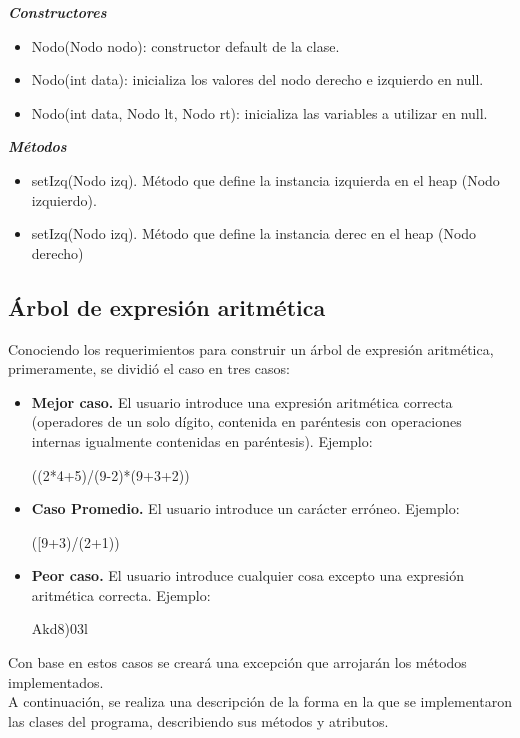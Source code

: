\documentclass{article}
\begin{document}
\textit{\textbf{Constructores}}
\begin{itemize}
    \item Nodo(Nodo nodo): constructor default de la clase.
    \item Nodo(int data): inicializa los valores del nodo derecho e izquierdo en null.
    \item Nodo(int data, Nodo lt, Nodo rt): inicializa las variables a utilizar en null.
\end{itemize}

\textit{\textbf{Métodos}}
\begin{itemize}
    \item setIzq(Nodo izq). Método que define la instancia izquierda en el heap (Nodo izquierdo).
    \item setIzq(Nodo izq). Método que define la instancia derec en el heap (Nodo derecho)
    
\end{itemize}
\newpage
\subsection{Árbol de expresión aritmética}
\vspace{5mm} %
Conociendo los requerimientos para construir un árbol de expresión aritmética, primeramente, se dividió el caso en tres casos:
\begin{itemize}
\item \textbf{Mejor caso.} El usuario introduce una expresión aritmética correcta (operadores de un solo dígito, contenida en paréntesis con operaciones internas igualmente contenidas en paréntesis). Ejemplo:
\begin{center}
 ((2*4+5)/(9-2)*(9+3+2))   
\end{center}
\item \textbf{Caso Promedio.} El usuario introduce un carácter erróneo. Ejemplo:
\begin{center}
 ([9+3)/(2+1))  
\end{center}
\item \textbf{Peor caso.} El usuario introduce cualquier cosa excepto una expresión aritmética correcta. Ejemplo:
\begin{center}
 Akd8)03l
 \end{center}
\end{itemize}
Con base en estos casos se creará una excepción que arrojarán los métodos implementados.\\

A continuación, se realiza una descripción de la forma en la que se implementaron las clases
del programa, describiendo sus métodos y atributos.\\
\end{document}
